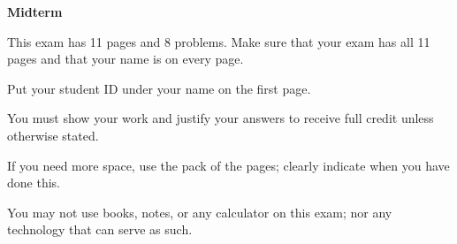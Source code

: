 \documentclass[11pt]{article}
\begin{document}
\begin{center} \Large\textbf{Midterm} \end{center}

\noindent This exam has 11 pages and 8 problems. Make sure that your exam has all 11 pages and that your name is on every page. 

\noindent Put your student ID under your name on the first page. 

\noindent You must show your work and justify your answers to receive full credit unless otherwise stated. 

\noindent If you need more space, use the pack of the pages; clearly indicate when you have done this. 

\noindent You may not use books, notes, or any calculator on this exam; nor any technology that can serve as such.
\end{document}
